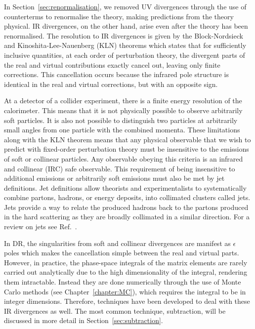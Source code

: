 \documentclass[main.tex]{subfiles}
\begin{document}
    In Section~\ref{sec:renormalisation}, we removed UV divergences
    through the use of counterterms to renormalise the theory, making
    predictions from the theory physical.
    IR divergences, on the other hand, arise even after the theory
    has been renormalised. The resolution to IR divergences is given by the
    Block-Nordsieck \cite{Bloch:1937pw,Yennie:1961ad} and Kinoshita-Lee-Nauenberg
    (KLN) theorems \cite{Kinoshita:1962ur,Lee:1964is} which states
    that for sufficiently inclusive quantities, at each order of
    perturbation theory, the divergent parts of the real and virtual
    contributions exactly cancel out, leaving only finite corrections.
    This cancellation occurs because the infrared pole structure is
    identical in the real and virtual corrections, but with an opposite sign.

    At a detector of a collider experiment, there is a finite
    energy resolution of the calorimeter. This means that
    it is not physically possible to observe arbitrarily soft
    particles. It is also not possible to distinguish two particles
    at arbitrarily small angles from one particle with the combined
    momenta. These limitations along with the KLN theorem
    means that any physical observable that we wish to predict
    with fixed-order perturbation theory must be insensitive to the
    emissions of soft or collinear particles. Any observable obeying
    this criteria is an infrared and collinear (IRC) safe observable.
    This requirement of being insensitive to additional emissions
    or arbitrarily soft emissions must also be met by jet definitions.
    Jet definitions allow theorists and experimentalists to
    systematically combine partons, hadrons, or energy deposits,
    into collimated clusters called jets. Jets provide a way to relate
    the produced hadrons back to the partons produced in the hard scattering
    as they are broadly collimated in a similar direction.
    For a review on jets see Ref.~\cite{Salam:2010nqg}.

    In DR, the singularities from soft and collinear divergences
    are manifest as $\epsilon$ poles which makes the cancellation
    simple between the real and virtual parts. However, in practice, 
    the phase-space integrals of the matrix elements are rarely carried
    out analytically due to the high dimensionality of the integral,
    rendering them intractable.
    Instead they are done numerically through the use
    of Monte Carlo methods (see Chapter~\ref{chapter:MC}),
    which requires the integral to be in
    integer dimensions. Therefore, techniques
    have been developed to deal with these IR divergences as well. The
    most common technique, subtraction, will be discussed in
    more detail in Section~\ref{sec:subtraction}.
    
\end{document}
